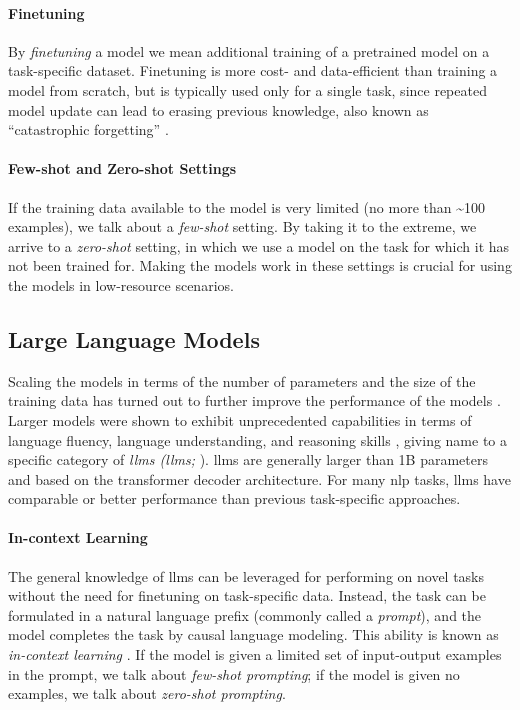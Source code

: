 \paragraph{Finetuning} By \emph{finetuning} a model we mean additional training of a pretrained model on a task-specific dataset. Finetuning is more cost- and data-efficient than training a model from scratch, but is typically used only for a single task, since repeated model update can lead to erasing previous knowledge, also known as ``catastrophic forgetting'' \cite{mccloskey1989catastrophic,kirkpatrick2017overcoming}.


\paragraph{Few-shot and Zero-shot Settings} If the training data available to the model is very limited (no more than \textasciitilde 100 examples), we talk about a \emph{few-shot} setting. By taking it to the extreme, we arrive to a \emph{zero-shot} setting, in which we use a model on the task for which it has not been trained for. Making the models work in these settings is crucial for using the models in low-resource scenarios.

\subsection{Large Language Models}
\label{sec:llms}
Scaling the models in terms of the number of parameters and the size of the training data has turned out to further improve the performance of the models \cite{kaplan2020scaling,hoffmann2022training}. Larger models were shown to exhibit unprecedented capabilities in terms of language fluency, language understanding, and reasoning skills \cite{wei2022emergent,bubeck2023sparks}, giving name to a specific category of \emph{\aclp{llm} (\acsp{llm};} \citealp{brown2020language,zhao2023survey}). \Acp{llm} are generally larger than 1B parameters and based on the transformer decoder architecture. For many \ac{nlp} tasks, \acp{llm} have comparable or better performance than previous task-specific approaches.

\paragraph{In-context Learning} The general knowledge of \acp{llm} can be leveraged for performing on novel tasks without the need for finetuning on task-specific data. Instead, the task can be formulated in a natural language prefix (commonly called a \emph{prompt}), and the model completes the task by causal language modeling. This ability is known as \emph{in-context learning} \cite{brown2020language,dong2022survey}. If the model is given a limited set of input-output examples in the prompt, we talk about \emph{few-shot prompting}; if the model is given no examples, we talk about \emph{zero-shot prompting}.

